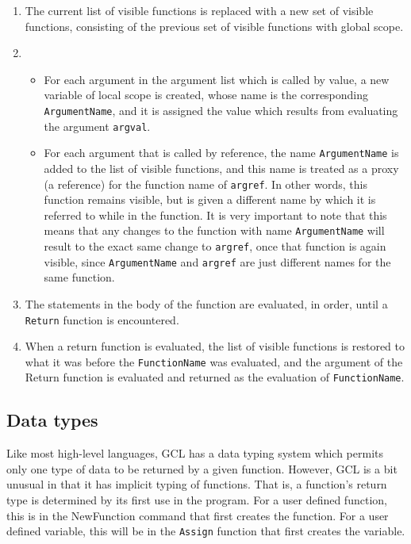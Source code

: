 \begin{enumerate}
\item
The current list of visible functions is 
replaced with a new set of visible functions, consisting of the
previous set of visible functions with global scope.  
 
\item
\begin{itemize}
\item
For each argument in the argument list which is called by
value, a new variable of local scope is created, whose name is the
corresponding \verb+ArgumentName+, and it is assigned the value
which results from evaluating the argument \verb+argval+.  
\item
For each
argument that is called by reference, the name \verb+ArgumentName+ is
added to the list of visible functions, and this name is treated as a
proxy (a reference) for the function name of \verb+argref+.  In other
words, this function remains visible, but is given a different name by
which it is referred to while in the function.  It is very important
to note that this means that any changes to the function with name
\verb+ArgumentName+ will result to the exact same change to
\verb+argref+, once that function is again visible, since
\verb+ArgumentName+ and \verb+argref+ are just different names for the
same function.
\end{itemize}

\item
The statements in the body of the function are evaluated, in
order, until a \verb+Return+ function is encountered.  

\item
When a return function is evaluated, the list of visible
functions is restored to what it was before the \verb+FunctionName+
was evaluated, and the argument of the Return function is evaluated
and returned as the evaluation of \verb+FunctionName+. 
\end{enumerate}

\subsection{Data types}

Like most high-level languages, GCL has a data typing system which
permits only one type of data to be returned by a given function.
However, GCL is a bit unusual in that it has implicit typing of
functions.  That is, a function's return type is determined by its
first use in the program.  For a user defined function, this is in the
NewFunction command that first creates the function.  For a user
defined variable, this will be in the \verb+Assign+ function that
first creates the variable.

